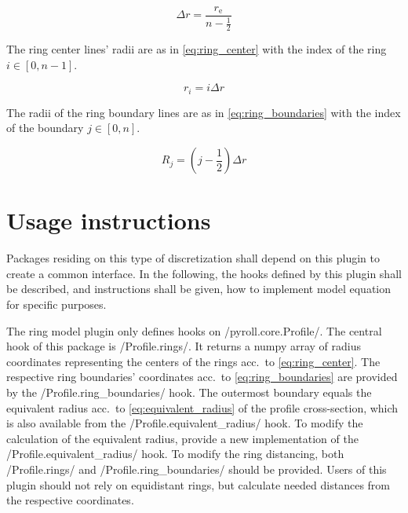 \documentclass[11pt]{PyRollDocs}
\begin{document}
    \begin{equation}
        \Delta r = \frac{r_{\mathrm{e}}}{n - \frac{1}{2}}
        \label{eq:delta_r}
    \end{equation}

    The ring center lines' radii are as in \autoref{eq:ring_center} with the index of the ring $i \in [0, n-1]$.

    \begin{equation}
        r_i = i \Delta r
        \label{eq:ring_center}
    \end{equation}

    The radii of the ring boundary lines are as in \autoref{eq:ring_boundaries} with the index of the boundary $j \in [0, n]$.

    \begin{equation}
        R_j = \left(j - \frac{1}{2}\right) \Delta r
        \label{eq:ring_boundaries}
    \end{equation}


    \section{Usage instructions}\label{sec:usage-instructions}

    Packages residing on this type of discretization shall depend on this plugin to create a common interface.
    In the following, the hooks defined by this plugin shall be described, and instructions shall be given, how to implement model equation for specific purposes.

    The ring model plugin only defines hooks on \py/pyroll.core.Profile/.
    The central hook of this package is \py/Profile.rings/.
    It returns a numpy array of radius coordinates representing the centers of the rings acc.\ to \autoref{eq:ring_center}.
    The respective ring boundaries' coordinates acc.\ to \autoref{eq:ring_boundaries}  are provided by the \py/Profile.ring_boundaries/ hook.
    The outermost boundary equals the equivalent radius acc.\ to \autoref{eq:equivalent_radius}  of the profile cross-section, which is also available from the \py/Profile.equivalent_radius/ hook.
    To modify the calculation of the equivalent radius, provide a new implementation of the \py/Profile.equivalent_radius/ hook.
    To modify the ring distancing, both \py/Profile.rings/ and \py/Profile.ring_boundaries/ should be provided.
    Users of this plugin should not rely on equidistant rings, but calculate needed distances from the respective coordinates.
\end{document}

